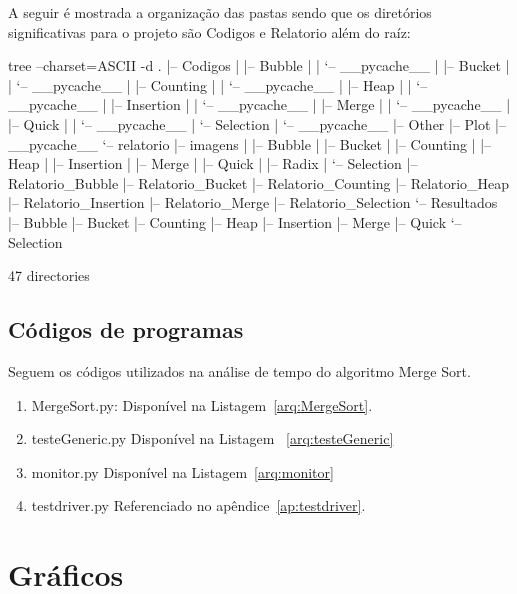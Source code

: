 \documentclass[12pt,a4paper,twoside]{report}
\begin{document}
A seguir é mostrada a organização das pastas sendo que os diretórios significativas para o projeto são Codigos e Relatorio além do raíz:
\begin{terminal}
tree --charset=ASCII -d
.
|-- Codigos
|   |-- Bubble
|   |   `-- __pycache__
|   |-- Bucket
|   |   `-- __pycache__
|   |-- Counting
|   |   `-- __pycache__
|   |-- Heap
|   |   `-- __pycache__
|   |-- Insertion
|   |   `-- __pycache__
|   |-- Merge
|   |   `-- __pycache__
|   |-- Quick
|   |   `-- __pycache__
|   `-- Selection
|       `-- __pycache__
|-- Other
|-- Plot
|-- __pycache__
`-- relatorio
    |-- imagens
    |   |-- Bubble
    |   |-- Bucket
    |   |-- Counting
    |   |-- Heap
    |   |-- Insertion
    |   |-- Merge
    |   |-- Quick
    |   |-- Radix
    |   `-- Selection
    |-- Relatorio_Bubble
    |-- Relatorio_Bucket
    |-- Relatorio_Counting
    |-- Relatorio_Heap
    |-- Relatorio_Insertion
    |-- Relatorio_Merge
    |-- Relatorio_Selection
    `-- Resultados
        |-- Bubble
        |-- Bucket
        |-- Counting
        |-- Heap
        |-- Insertion
        |-- Merge
        |-- Quick
        `-- Selection

47 directories
\end{terminal}

\section{Códigos de programas}
Seguem os códigos utilizados na análise de tempo do algoritmo Merge Sort.
\begin{enumerate}

\item MergeSort.py:
Disponível na Listagem~\ref{arq:MergeSort}.


\item testeGeneric.py
Disponível na Listagem ~\ref{arq:testeGeneric}


\item monitor.py
Disponível na Listagem~\ref{arq:monitor}



\item testdriver.py
 Referenciado no apêndice~\ref{ap:testdriver}.
\end{enumerate}


\chapter{Gráficos}
\end{document}
